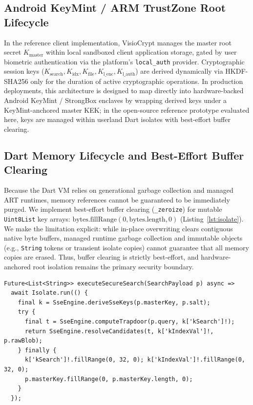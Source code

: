 \documentclass[10pt,conference]{IEEEtran}
\begin{document}
\subsection{Android KeyMint / ARM TrustZone Root Lifecycle}
In the reference client implementation, VisioCrypt manages the master root secret $K_{\text{master}}$ within local sandboxed client application storage, gated by user biometric authentication via the platform's \texttt{local\_auth} provider. Cryptographic session keys ($K_{\text{search}}, K_{\text{idx}}, K_{\text{file}}, K_{\text{l\_enc}}, K_{\text{l\_auth}}$) are derived dynamically via HKDF-SHA256 only for the duration of active cryptographic operations. In production deployments, this architecture is designed to map directly into hardware-backed Android KeyMint / StrongBox enclaves by wrapping derived keys under a KeyMint-anchored master KEK; in the open-source reference prototype evaluated here, keys are managed within userland Dart isolates with best-effort buffer clearing.

\subsection{Dart Memory Lifecycle and Best-Effort Buffer Clearing}
Because the Dart VM relies on generational garbage collection and managed ART runtimes, memory references cannot be guaranteed to be immediately purged. We implement best-effort buffer clearing (\texttt{\_zeroize}) for mutable \texttt{Uint8List} key arrays: $\text{bytes.fillRange}(0, \text{bytes.length}, 0)$ (Listing~\ref{lst:isolate}). We make the limitation explicit: while in-place overwriting clears contiguous native byte buffers, managed runtime garbage collection and immutable objects (e.g., \texttt{String} tokens or transient isolate copies) cannot guarantee that all memory copies are erased. Thus, buffer clearing is strictly best-effort, and hardware-anchored root isolation remains the primary security boundary.

\noindent\begin{minipage}{\columnwidth}
\begin{lstlisting}[style=dartstyle,caption={Isolated Worker Routine with Best-Effort Buffer Clearing},label={lst:isolate}]
Future<List<String>> executeSecureSearch(SearchPayload p) async =>
  await Isolate.run(() {
    final k = SseEngine.deriveSseKeys(p.masterKey, p.salt);
    try {
      final t = SseEngine.computeTrapdoor(p.query, k['kSearch']!);
      return SseEngine.resolveCandidates(t, k['kIndexVal']!, p.rawBlob);
    } finally {
      k['kSearch']!.fillRange(0, 32, 0); k['kIndexVal']!.fillRange(0, 32, 0);
      p.masterKey.fillRange(0, p.masterKey.length, 0);
    }
  });
\end{lstlisting}
\end{minipage}
\end{document}
